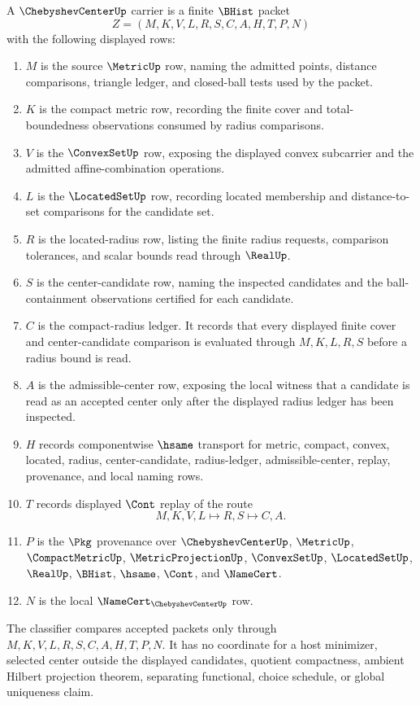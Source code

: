 \begin{definition}
\label{def:chebyshev-center-carrier}
A $\ChebyshevCenterUp$ carrier is a finite $\BHist$ packet
$$
Z=(M,K,V,L,R,S,C,A,H,T,P,N)
$$
with the following displayed rows:
\begin{enumerate}
\item $M$ is the source $\MetricUp$ row, naming the admitted points, distance comparisons, triangle ledger, and closed-ball tests used by the packet.
\item $K$ is the compact metric row, recording the finite cover and total-boundedness observations consumed by radius comparisons.
\item $V$ is the $\ConvexSetUp$ row, exposing the displayed convex subcarrier and the admitted affine-combination operations.
\item $L$ is the $\LocatedSetUp$ row, recording located membership and distance-to-set comparisons for the candidate set.
\item $R$ is the located-radius row, listing the finite radius requests, comparison tolerances, and scalar bounds read through $\RealUp$.
\item $S$ is the center-candidate row, naming the inspected candidates and the ball-containment observations certified for each candidate.
\item $C$ is the compact-radius ledger. It records that every displayed finite cover and center-candidate comparison is evaluated through $M,K,L,R,S$ before a radius bound is read.
\item $A$ is the admissible-center row, exposing the local witness that a candidate is read as an accepted center only after the displayed radius ledger has been inspected.
\item $H$ records componentwise $\hsame$ transport for metric, compact, convex, located, radius, center-candidate, radius-ledger, admissible-center, replay, provenance, and local naming rows.
\item $T$ records displayed $\Cont$ replay of the route
$$
M,K,V,L \longmapsto R,S \longmapsto C,A .
$$
\item $P$ is the $\Pkg$ provenance over $\ChebyshevCenterUp$, $\MetricUp$, $\CompactMetricUp$, $\MetricProjectionUp$, $\ConvexSetUp$, $\LocatedSetUp$, $\RealUp$, $\BHist$, $\hsame$, $\Cont$, and $\NameCert$.
\item $N$ is the local $\NameCert_{\ChebyshevCenterUp}$ row.
\end{enumerate}
The classifier compares accepted packets only through $M,K,V,L,R,S,C,A,H,T,P,N$. It has no coordinate for a host minimizer, selected center outside the displayed candidates, quotient compactness, ambient Hilbert projection theorem, separating functional, choice schedule, or global uniqueness claim.
\end{definition}

